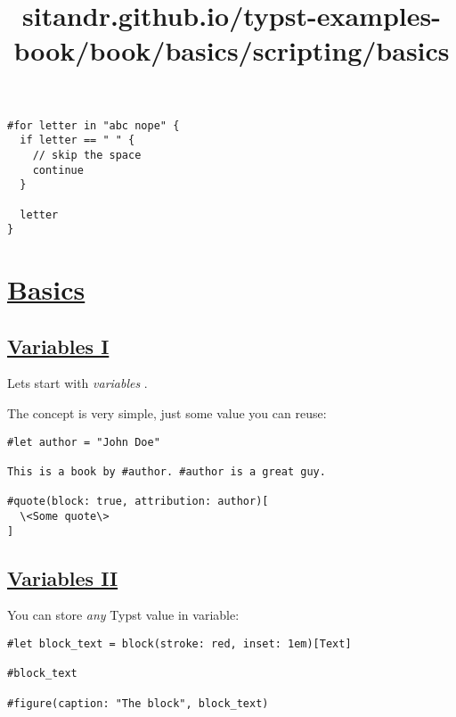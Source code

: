 \begin{verbatim}
#for letter in "abc nope" {
  if letter == " " {
    // skip the space
    continue
  }

  letter
}
\end{verbatim}

\pandocbounded{}


\title{sitandr.github.io/typst-examples-book/book/basics/scripting/basics}

\section{\texorpdfstring{\hyperref[basics]{Basics}}{Basics}}\label{basics}

\subsection{\texorpdfstring{\hyperref[variables-i]{Variables
I}}{Variables I}}\label{variables-i}

Let\textquotesingle s start with \emph{variables} .

The concept is very simple, just some value you can reuse:

\begin{verbatim}
#let author = "John Doe"

This is a book by #author. #author is a great guy.

#quote(block: true, attribution: author)[
  \<Some quote\>
]
\end{verbatim}

\pandocbounded{}

\subsection{\texorpdfstring{\hyperref[variables-ii]{Variables
II}}{Variables II}}\label{variables-ii}

You can store \emph{any} Typst value in variable:

\begin{verbatim}
#let block_text = block(stroke: red, inset: 1em)[Text]

#block_text

#figure(caption: "The block", block_text)
\end{verbatim}

